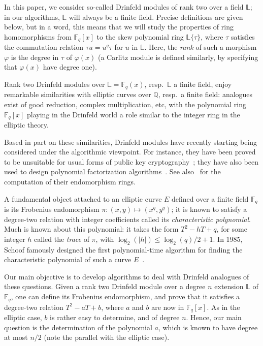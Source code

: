 \documentclass[sigconf]{acmart}
\newcommand{\Q}{\mathbb{Q}}
\newcommand{\F}{\mathbb{F}}
\renewcommand{\L}{\mathbb{L}}
\newcommand{\ang}[1]{\{#1\}}
\begin{document}
In this paper, we consider so-called Drinfeld modules of rank two over
a field $\L$; in our algorithms, $\L$ will always be a finite
field. Precise definitions are given below, but in a word, this means
that we will study the properties of ring homomorphisms from $\F_q[x]$ to
the skew polynomial ring $\L\ang{\tau}$, where $\tau$ satisfies the
commutation relation $\tau u = u^q \tau$ for $u$ in $\L$. Here, the
{\em rank} of such a morphism $\varphi$ is the degree in $\tau$ of
$\varphi(x)$ (a Carlitz module is defined similarly, by specifying that
$\varphi(x)$ have degree one).

Rank two Drinfeld modules over $\L=\F_q(x)$, resp.\ $\L$ a finite
field, enjoy remarkable similarities with elliptic curves over $\Q$,
resp.\ a finite field: analogues exist of good reduction, complex
multiplication, etc, with the polynomial ring $\F_q[x]$ playing in the
Drinfeld world a role similar to the integer ring in the elliptic
theory.

Based in part on these similarities, Drinfeld modules have recently
starting being considered under the algorithmic viewpoint. For
instance, they have been proved to be unsuitable for usual forms of
public key cryptography~\cite{Scanlon01}; they have also been used to
design polynomial factorization
algorithms~\cite{PaPo89,vanderHeiden04,Narayanan18,eschost2017arXiv171200669D}.
See also~\cite{GaPa18} for the computation of their endomorphism rings.

A fundamental object attached to an elliptic curve $E$ defined over a
finite field $\F_q$ is its Frobenius endomorphism $\pi:(x,y) \mapsto
(x^q,y^q)$; it is known to satisfy a degree-two relation with integer
coefficients called its {\em characteristic polynomial}. Much is known
about this polynomial: it takes the form $T^2 - h T + q$, for some
integer $h$ called the {\em trace} of $\pi$, with $\log_2(|h|) \le
\log_2(q)/2 + 1$. In 1985, Schoof famously designed the first
polynomial-time algorithm for finding the characteristic polynomial of
such a curve $E$~\cite{schoof85}.

Our main objective is to develop algorithms to deal with Drinfeld
analogues of these questions. Given a rank two Drinfeld module over a
degree $n$ extension $\L$ of $\F_q$, one can define its Frobenius
endomorphism, and prove that it satisfies a degree-two relation $T^2 -
a T + b$, where $a$ and $b$ are now in $\F_q[x]$. As in the elliptic
case, $b$ is rather easy to determine, and of degree $n$. Hence, our
main question is the determination of the polynomial $a$, which is
known to have degree at most $n/2$ (note the parallel with the
elliptic case).
\end{document}
